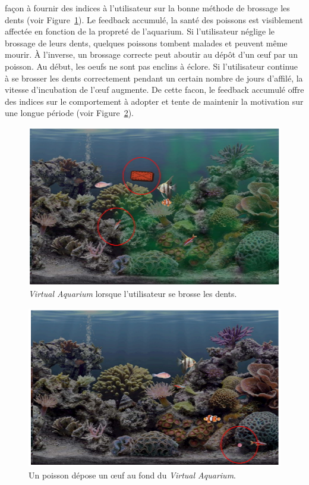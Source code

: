 \documentclass[10pt,a5paper,twoside]{article}
\begin{document}
\begin{itemize}
  façon à fournir des indices à l'utilisateur sur la bonne méthode de
  brossage les dents (voir Figure~\ref{fig:virtualaquarium2}). Le
  feedback accumulé, la santé des poissons est visiblement affectée en
  fonction de la propreté de l'aquarium. Si l'utilisateur néglige le
  brossage de leurs dents, quelques poissons tombent malades et peuvent
  même mourir. À l'inverse, un brossage correcte peut aboutir au dépôt
  d'un œuf par un poisson. Au début, les oeufs ne sont pas enclins à
  éclore. Si l'utilisateur continue à se brosser les dents correctement
  pendant un certain nombre de jours d'affilé, la vitesse d'incubation
  de l'œuf augmente. De cette facon, le feedback accumulé offre des
  indices sur le comportement à adopter et tente de maintenir la
  motivation sur une longue période (voir
  Figure~\ref{fig:virtualaquarium3}).
\end{itemize}

\begin{figure}
\centering
\includegraphics[]{images/virtualaquarium-screenshot3.png}
\caption{\emph{Virtual Aquarium} lorsque l'utilisateur se brosse les
dents.}\label{fig:virtualaquarium2}
\end{figure}

\begin{figure}
\centering
\includegraphics[]{images/virtualaquarium-screenshot4.png}
\caption{Un poisson dépose un œuf au fond du \emph{Virtual
Aquarium}.}\label{fig:virtualaquarium3}
\end{figure}
\end{document}
